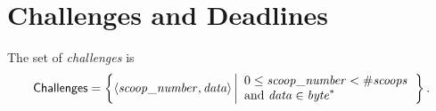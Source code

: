 \section{Challenges and Deadlines}\label{sec:challenges_and_deadlines}

\begin{definition}[Challenge]\label{def:challenge}
  The set of \emph{challenges} is
  \[
  {\mathsf{Challenges}}=\left\{\langle{\mathit{scoop\_number}},{\mathit{data}}\rangle\left|
  \begin{array}{l}
    0\le{\mathit{scoop\_number}}<{\#\mathit{scoops}}\\
    \text{and }{\mathit{data}}\in\mathit{byte}^*
  \end{array}
  \right.\right\}.
  \]
\end{definition}

